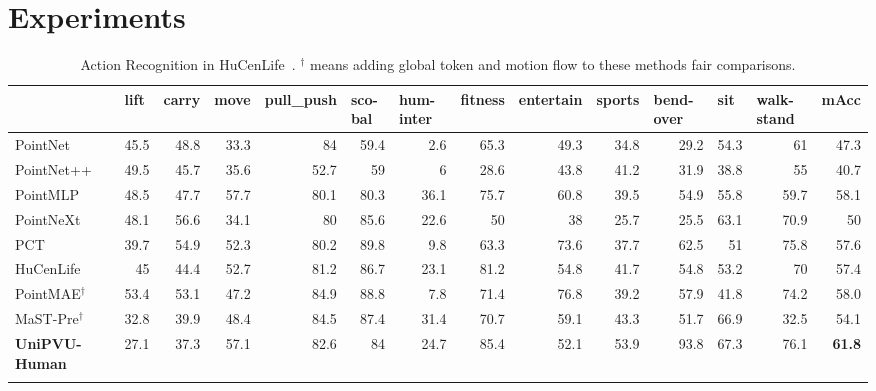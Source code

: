 \section{Experiments}
\label{sec:experiments}
\begin{table}\scriptsize 
\caption{Action Recognition in HuCenLife~\cite{xu2023human}.  $^{\dag}$ means adding global token and motion flow to these methods fair comparisons.}
\begin{tabular}{l|r|r|r|r|r|r|r|r|r|r|r|r|r}
\Xhline{1px}
                       & \multicolumn{1}{l|}{lift} & \multicolumn{1}{l|}{carry} & \multicolumn{1}{l|}{move} & \multicolumn{1}{l|}{pull\_push} & \multicolumn{1}{l|}{sco-bal} & \multicolumn{1}{l|}{hum-inter} & \multicolumn{1}{l|}{fitness} & \multicolumn{1}{l|}{entertain} & \multicolumn{1}{l|}{sports} & \multicolumn{1}{l|}{bend-over} & \multicolumn{1}{l|}{sit} & \multicolumn{1}{l|}{walk-stand} & \multicolumn{1}{l}{mAcc} \\ \hline
PointNet~\cite{qi2017pointnet}              & 45.5& 48.8& 33.3& 84& 59.4& 2.6& 65.3& 49.3& 34.8& 29.2& 54.3& 61& 47.3
\\ \hline
PointNet++~\cite{qi2017pointnet++}            & 49.5& 45.7& 35.6& 52.7& 59& 6& 28.6& 43.8& 41.2& 31.9& 38.8& 55& 40.7
\\ \hline
PointMLP~\cite{ma2022rethinking}              & 48.5& 47.7& 57.7& 80.1& 80.3& 36.1& 75.7& 60.8& 39.5& 54.9& 55.8& 59.7& 58.1
\\ \hline
PointNeXt~\cite{qian2022pointnext}             & 48.1& 56.6& 34.1& 80& 85.6& 22.6& 50& 38& 25.7& 25.5& 63.1& 70.9& 50
\\ \hline
PCT~\cite{guo2021pct} & 39.7& 54.9& 52.3& 80.2& 89.8& 9.8& 63.3& 73.6& 37.7& 62.5& 51& 75.8& 57.6
\\ \hline
HuCenLife~\cite{xu2023human}             & 45& 44.4& 52.7& 81.2& 86.7& 23.1& 81.2& 54.8& 41.7& 54.8& 53.2& 70& 57.4
\\ \hline
PointMAE$^{\dag}$~\cite{pang2022masked} & 53.4& 53.1& 47.2& 84.9& 88.8& 7.8& 71.4& 76.8& 39.2& 57.9& 41.8& 74.2& 58.0
\\ \hline
MaST-Pre$^{\dag}$~\cite{shen2023masked}  & 32.8& 39.9& 48.4& 84.5& 87.4& 31.4& 70.7& 59.1& 43.3& 51.7& 66.9& 32.5& 54.1
\\ \hline

\textbf{UniPVU-Human}& 27.1& 37.3& 57.1& 82.6& 84& 24.7& 85.4& 52.1& 53.9& 93.8& 67.3& 76.1& \textbf{61.8}\\ \Xhline{1px}
\end{tabular}
\label{experiment:hucenlife}
\end{table}

